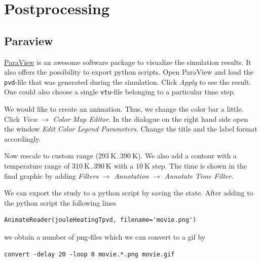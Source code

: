 \documentclass{article}
\begin{document}
\section{Postprocessing}
\label{Sec:PostProc}
\subsection{Paraview}
\href{https://www.paraview.org/}{ParaView} is an awesome software package to visualize the simulation results.
It also offers the possibility to export python scripts.
Open ParaView and load the \texttt{pvd}-file that was generated during the simulation.
Click \textit{Apply} to see the result.
One could also choose a single \texttt{vtu}-file belonging to a particular time step.
 
We would like to create an animation.
Thus, we change the color bar a little.
Click \textit{View} $\rightarrow$ \textit{Color Map Editor}.
In the dialogue on the right hand side open the window \textit{Edit Color Legend Parameters}.
Change the title and the label format accordingly.

Now rescale to custom range ($\SI{293}{\K} .. \SI{390}{\K}$).
We also add a contour with a temperature range of $\SI{310}{\K} .. \SI{390}{\K}$ with a $\SI{10}{\K}$ step.
The time is shown in the final graphic by adding \textit{Filters} $\rightarrow$ \textit{Annotation} $\rightarrow$ \textit{Annotate Time Filter}.

We can export the study to a python script by saving the state.
After adding to the python script the following lines
\begin{lstlisting}
AnimateReader(jouleHeatingTpvd, filename='movie.png')
\end{lstlisting}
we obtain a number of png-files which we can convert to a gif by
\begin{lstlisting}
convert -delay 20 -loop 0 movie.*.png movie.gif
\end{lstlisting}
\end{document}
